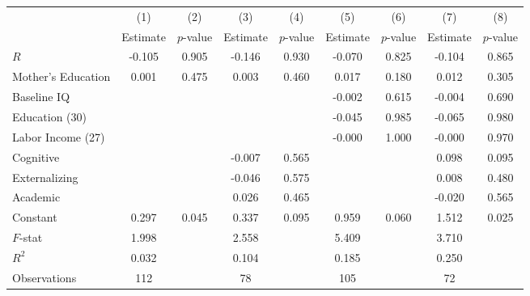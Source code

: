 \begin{tabular}{lcccccccc} \toprule
 & (1) & (2) & (3) & (4) & (5) & (6) & (7) & (8) \\ 
 & Estimate  & $p$-value  & Estimate  & $p$-value  & Estimate  & $p$-value  & Estimate  & $p$-value  \\  \midrule
$R$ &    -0.105 &     0.905 &    -0.146 &     0.930 &    -0.070 &     0.825 &    -0.104 &     0.865 \\  
Mother's Education &     0.001 &     0.475 &     0.003 &     0.460 &     0.017 &     0.180 &     0.012 &     0.305 \\  
Baseline IQ &         &         &         &         &    -0.002 &     0.615 &    -0.004 &     0.690 \\  
Education (30) &         &         &         &         &    -0.045 &     0.985 &    -0.065 &     0.980 \\  
Labor Income (27) &         &         &         &         &    -0.000 &     1.000 &    -0.000 &     0.970 \\  
Cognitive &         &         &    -0.007 &     0.565 &         &         &     0.098 &     0.095 \\  
Externalizing &         &         &    -0.046 &     0.575 &         &         &     0.008 &     0.480 \\  
Academic &         &         &     0.026 &     0.465 &         &         &    -0.020 &     0.565 \\  
Constant &     0.297 &     0.045 &     0.337 &     0.095 &     0.959 &     0.060 &     1.512 &     0.025 \\  \midrule
$F$-stat &     1.998 &         &     2.558 &         &     5.409 &         &     3.710 &         \\  
$R^2$ &     0.032 &         &     0.104 &         &     0.185 &         &     0.250 &         \\  
Observations &   112 &         &    78 &         &   105 &         &    72 &         \\  
\bottomrule
\end{tabular}

